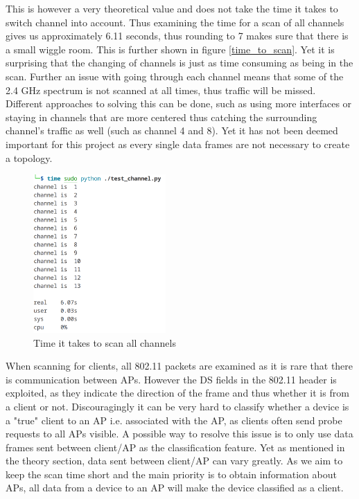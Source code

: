 This is however a very theoretical value and does not take the time it takes to switch channel into account. Thus examining the time for a scan of all channels gives us approximately 6.11 seconds, thus rounding to 7 makes sure that there is a small wiggle room. This is further shown in figure \ref{time_to_scan}. Yet it is surprising that the changing of channels is just as time consuming as being in the scan. Further an issue with going through each channel means that some of the 2.4 GHz spectrum is not scanned at all times, thus traffic will be missed. Different approaches to solving this can be done, such as using more interfaces or staying in channels that are more centered thus catching the surrounding channel's traffic as well (such as channel 4 and 8). Yet it has not been deemed important for this project as every single data frames are not necessary to create a topology. 

\begin{figure}[!htbp]
    \centering
    \includegraphics[width=0.45\textwidth]{Latex-Files/Billeder/Implementation/time_to_scan.png}
    \caption{Time it takes to scan all channels}
    \label{timne_to_scan}
\end{figure}
 
When scanning for clients, all 802.11 packets are examined as it is rare that there is communication between APs. However the DS fields in the 802.11 header is exploited, as they indicate the direction of the frame and thus whether it is from a client or not. Discouragingly it can be very hard to classify whether a device is a "true" client to an AP i.e. associated with the AP, as clients often send probe requests to all APs visible. A possible way to resolve this issue is to only use data frames sent between client/AP as the classification feature. Yet as mentioned in the theory section, data sent between client/AP can vary greatly. As we aim to keep the scan time short and the main priority is to obtain information about APs, all data from a device to an AP will make the device classified as a client.  

